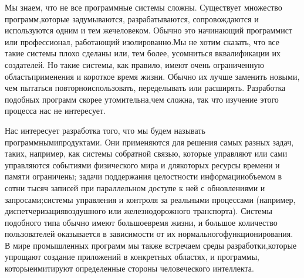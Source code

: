 \documentclass[10pt]{article}
\begin{document}
Мы знаем, что не все программные системы сложны. Существует множество программ,\linebreak  которые задумываются, разрабатываются, сопровождаются и используются одним и тем же\linebreak  человеком. Обычно это начинающий программист или профессионал, работающий изолированно.\linebreak  Мы не хотим сказать, что все такие системы плохо сделаны или, тем более, усомниться в\linebreak  квалификации их создателей. Но такие системы, как правило, имеют очень ограниченную область\linebreak  применения и короткое время жизни. Обычно их лучше заменить новыми, чем пытаться повторно\linebreak  использовать, переделывать или расширять. Разработка подобных программ скорее утомительна,\linebreak  чем сложна, так что изучение этого процесса нас не интересует. \vspace{3mm}

Нас интересует разработка того, что мы будем называть  программными\linebreak  продуктами\rm. Они применяются для решения самых разных задач, таких, например, как системы с\linebreak  обратной связью, которые управляют или сами управляются событиями физического мира и для\linebreak  которых ресурсы времени и памяти ограничены; задачи поддержания целостности информации\linebreak  объемом в сотни тысяч записей при параллельном доступе к ней с обновлениями и запросами;\linebreak  системы управления и контроля за реальными процессами (например, диспетчеризация\linebreak  воздушного или железнодорожного транспорта). Системы подобного типа обычно имеют большое\linebreak  время жизни, и большое количество пользователей оказывается в зависимости от их нормального\linebreak  функционирования. В мире промышленных программ мы также встречаем среды разработки,\linebreak  которые упрощают создание приложений в конкретных областях, и программы, которые\linebreak  имитируют определенные стороны человеческого интеллекта. \vspace{3mm}
\end{document}
